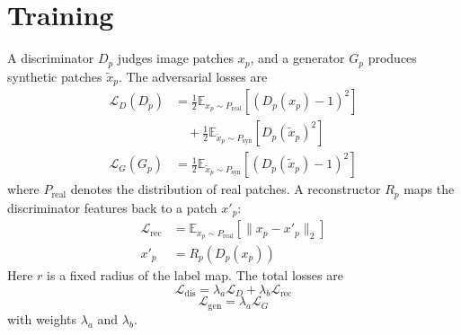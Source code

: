 \documentclass[11pt]{article}
\begin{document}
\section{Training}
A discriminator $D_p$ judges image patches $x_p$, and a generator $G_p$ produces
synthetic patches $\tilde{x}_p$. The adversarial losses are
\begin{equation}
\begin{aligned}
  \mathcal{L}_{D}(D_p) &= \frac{1}{2}\mathbb{E}_{x_p \sim P_{\mathrm{real}}}[(D_p(x_p) - 1)^2] \\
  &\quad + \frac{1}{2}\mathbb{E}_{\tilde{x}_p \sim P_{\mathrm{syn}}}[D_p(\tilde{x}_p)^2] \\
  \mathcal{L}_{G}(G_p) &= \frac{1}{2}\mathbb{E}_{\tilde{x}_p \sim P_{\mathrm{syn}}}[(D_p(\tilde{x}_p) - 1)^2]
\end{aligned}
\end{equation}
where $P_{\mathrm{real}}$ denotes the distribution of real patches. A reconstructor
$R_p$ maps the discriminator features back to a patch $x'_p$:
\begin{equation}
\begin{aligned}
  \mathcal{L}_{\mathrm{rec}} &= \mathbb{E}_{x_p \sim P_{\mathrm{real}}}[\|x_p - x'_p\|_2] \\
  x'_p &= R_p(D_p(x_p))
\end{aligned}
\end{equation}
Here $r$ is a fixed radius of the label map. The total losses are
\begin{equation}
  \mathcal{L}_{\mathrm{dis}} = \lambda_{a}\mathcal{L}_{D} + \lambda_{b}\mathcal{L}_{\mathrm{rec}}
\end{equation}
\begin{equation}
  \mathcal{L}_{\mathrm{gen}} = \lambda_{a}\mathcal{L}_{G}
\end{equation}
with weights $\lambda_a$ and $\lambda_b$.
\end{document}
